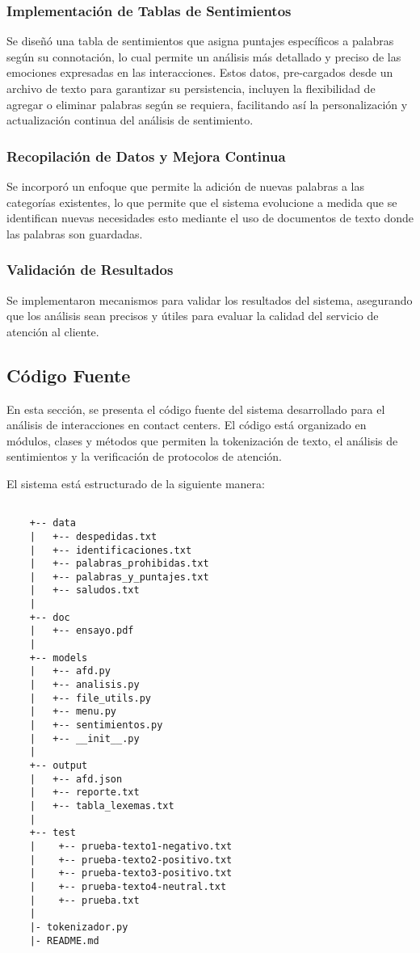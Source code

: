 \documentclass[12pt,a4paper]{article}
\begin{document}
\subsubsection{Implementación de Tablas de Sentimientos}
Se diseñó una tabla de sentimientos que asigna puntajes específicos a palabras según su connotación, lo cual permite un análisis más detallado y preciso de las emociones expresadas en las interacciones. Estos datos, pre-cargados desde un archivo de texto para garantizar su persistencia, incluyen la flexibilidad de agregar o eliminar palabras según se requiera, facilitando así la personalización y actualización continua del análisis de sentimiento.

\subsubsection{Recopilación de Datos y Mejora Continua}
Se incorporó un enfoque que permite la adición de nuevas palabras a las categorías existentes, lo que permite que el sistema evolucione a medida que se identifican nuevas necesidades esto mediante el uso de documentos de texto donde las palabras son guardadas.

\subsubsection{Validación de Resultados}
Se implementaron mecanismos para validar los resultados del sistema, asegurando que los análisis sean precisos y útiles para evaluar la calidad del servicio de atención al cliente.
\newpage
\subsection{Código Fuente}
En esta sección, se presenta el código fuente del sistema desarrollado para el análisis de interacciones en contact centers. El código está organizado en módulos, clases y métodos que permiten la tokenización de texto, el análisis de sentimientos y la verificación de protocolos de atención.

El sistema está estructurado de la siguiente manera:
\begin{tcolorbox}[colback=gray!10, colframe=gray!80, sharp corners, boxrule=0.5pt]
\begin{verbatim}
    
    +-- data
    |   +-- despedidas.txt
    |   +-- identificaciones.txt
    |   +-- palabras_prohibidas.txt
    |   +-- palabras_y_puntajes.txt
    |   +-- saludos.txt
    |
    +-- doc
    |   +-- ensayo.pdf
    |
    +-- models
    |   +-- afd.py
    |   +-- analisis.py
    |   +-- file_utils.py
    |   +-- menu.py
    |   +-- sentimientos.py
    |   +-- __init__.py
    |
    +-- output
    |   +-- afd.json
    |   +-- reporte.txt
    |   +-- tabla_lexemas.txt
    |
    +-- test
    |    +-- prueba-texto1-negativo.txt
    |    +-- prueba-texto2-positivo.txt
    |    +-- prueba-texto3-positivo.txt
    |    +-- prueba-texto4-neutral.txt
    |    +-- prueba.txt
    |
    |- tokenizador.py
    |- README.md

\end{verbatim}
\end{tcolorbox}
\newpage
\end{document}
